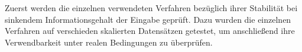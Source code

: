 Zuerst werden die einzelnen verwendeten Verfahren bezüglich ihrer Stabilität bei sinkendem Informationsgehalt der Eingabe geprüft. Dazu wurden die einzelnen Verfahren auf verschieden skalierten Datensätzen getestet, um anschließend ihre Verwendbarkeit unter realen Bedingungen zu überprüfen.
